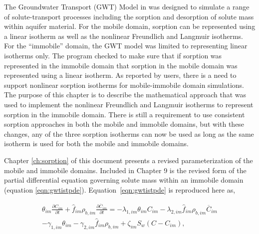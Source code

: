 The Groundwater Transport (GWT) Model \citep{modflow6gwt} in \mf was designed to simulate a range of solute-transport processes including the sorption and desorption of solute mass within aquifer material.  For the mobile domain, sorption can be represented using a linear isotherm as well as the nonlinear Freundlich and Langmuir isotherms.  For the ``immobile'' domain, the GWT model was limited to representing linear isotherms only.  The program checked to make sure that if sorption was represented in the immobile domain that sorption in the mobile domain was represented using a linear isotherm.  As reported by \mf users, there is a need to support nonlinear sorption isotherms for mobile-immobile domain simulations.  The purpose of this chapter is to describe the mathematical approach that was used to implement the nonlinear Freundlich and Langmuir isotherms to represent sorption in the immobile domain. There is still a requirement to use consistent sorption approaches in both the mobile and immobile domains, but with these changes, any of the three sorption isotherms can now be used as long as the same isotherm is used for both the mobile and immobile domains.

Chapter \ref{ch:sorption} of this document presents a revised parameterization of the mobile and immobile domains.  Included in Chapter 9 is the revised form of the partial differential equation governing solute mass within an immobile domain (equation \ref{eqn:gwtistpde}).  Equation~\ref{eqn:gwtistpde} is reproduced here as,

\begin{equation}
\label{eqn:gwtistpde2}
\begin{split}
\theta_{im} \frac{\partial C_{im} }{\partial t} + \hat{f}_{im} \rho_{b,im} \frac{\partial \overline{C}_{im}}{\partial t} = 
- \lambda_{1,im} \theta_{im} C_{im} - \lambda_{2,im}  \hat{f}_{im} \rho_{b,im} \overline{C}_{im} \\
- \gamma_{1,im} \theta_{im} - \gamma_{2,im} \hat{f}_{im} \rho_{b,im} 
+ \zeta_{im} S_w \left ( C - C_{im} \right ),
\end{split}
\end{equation}

